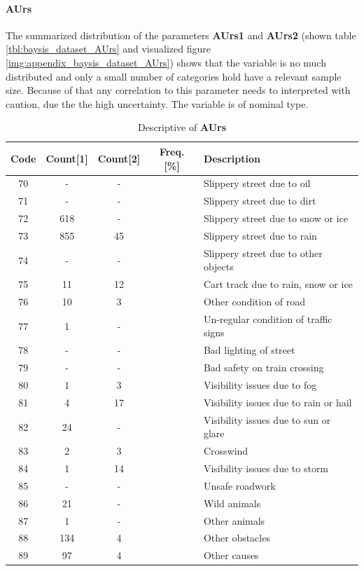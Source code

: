 \paragraph{AUrs}
\label{baysis_dataset_AUrs}
The summarized distribution of the parameters \textbf{AUrs1} and \textbf{AUrs2} (shown table \autoref{tbl:baysis_dataset_AUrs} and visualized figure \autoref{img:appendix_baysis_dataset_AUrs}) shows that the variable is no much distributed and only a small number of categories hold have a relevant sample size. Because of that any correlation to this parameter needs to interpreted with caution, due the the high uncertainty. The variable is of nominal type.
\begin{table}[ht]
	\centering
	\small
	\begin{tabular}{c|c|c|c|l}
		\toprule
		Code & Count[1] & Count[2] & Freq. [\%] & Description \\ 
		\midrule
		70 & - 		& -		& & Slippery street due to oil \\
		71 & -		& -		& & Slippery street due to dirt \\
		72 & 618	& -		& & Slippery street due to snow or ice \\
		73 & 855	& 45	& & Slippery street due to rain \\
		74 & -		& -		& & Slippery street due to other objects \\
		75 & 11		& 12	& & Cart track due to rain, snow or ice \\
		76 & 10		& 3		& & Other condition of road \\
		77 & 1		& -		& & Un-regular condition of traffic signs \\
		78 & -		& -		& & Bad lighting of street \\
		79 & -		& -		& & Bad safety on train crossing \\
		80 & 1		& 3		& & Visibility issues due to fog \\
		81 & 4		& 17 	& & Visibility issues due to rain or hail \\
		82 & 24		& -		& & Visibility issues due to sun or glare \\
		83 & 2		& 3		& & Crosswind \\
		84 & 1		& 14	& & Visibility issues due to storm \\
		85 & -		& -		& & Unsafe roadwork \\
		86 & 21		& -		& & Wild animals \\
		87 & 1		& -		& & Other animals \\
		88 & 134	& 4		& & Other obstacles \\
		89 & 97		& 4		& & Other causes \\
		\bottomrule
	\end{tabular}
	\caption{Descriptive of \textbf{AUrs}}
	\label{tbl:baysis_dataset_AUrs}
	\vspace{-8mm}
\end{table}

